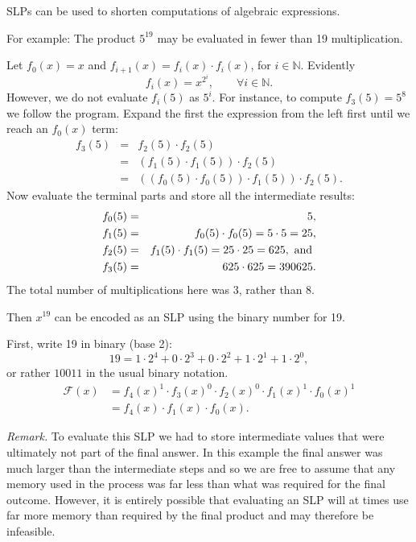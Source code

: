 \documentclass[12pt]{article}
\begin{document}
SLPs can be used to shorten computations of algebraic expressions.

For example: The product $5^{19}$ may be evaluated in fewer than 19 multiplication.

Let $f_0(x)=x$ and $f_{i+1}(x)=f_{i}(x)\cdot f_{i}(x)$, for $i\in \mathbb{N}$.
Evidently
\[f_i(x) =x^{2^i},\qquad \forall i\in\mathbb{N}.\]
However, we do not evaluate $f_i(5)$ as $5^i$.  For instance, to compute $f_3(5)=5^8$ we 
follow the program.  Expand the first the expression from the left first until we
reach an $f_0(x)$ term:
\begin{eqnarray*}
f_3(5) & = & f_2(5)\cdot f_2(5) \\
 & = & ( f_1(5)\cdot f_1(5) )\cdot f_2(5)\\
 & = & ( ( f_0(5)\cdot f_0(5) ) \cdot f_1(5) ) \cdot f_2(5).
\end{eqnarray*}
Now evaluate the terminal parts and store all the intermediate results:
\begin{eqnarray*}
 f_0(5) & = & 5,\\
 f_1(5) & = & f_0(5)\cdot f_0(5)=5\cdot 5=25,\\
 f_2(5) & = & f_1(5)\cdot f_1(5) = 25\cdot 25 = 625,\textnormal{ and }\\
 f_3(5) & = & 625\cdot 625=390625.
\end{eqnarray*}
The total number of multiplications here was 3, rather than 8.  



Then $x^{19}$ can be encoded as an SLP using the binary number for 19.

First, write 19 in binary (base 2): 
\[ 19=1\cdot 2^4+0\cdot 2^3+0\cdot 2^2+1\cdot 2^1+1\cdot 2^0,\]
or rather $10011$ in the usual binary notation.
\begin{equation*}
\begin{split}
  \mathcal{F}(x) & = f_4(x)^1 \cdot f_3(x)^0 \cdot f_2(x)^0\cdot f_1(x)^1\cdot f_0(x)^1\\
     & = f_4(x)\cdot f_1(x)\cdot f_0(x).
\end{split}
\end{equation*}




\emph{Remark.} To evaluate this SLP we had to store intermediate values that
were ultimately not part of the final answer.  In this example the final answer
was much larger than the intermediate steps and so we are free to assume that
any memory used in the process was far less than what was required for the final
outcome.  However, it is entirely possible that evaluating an SLP will at times
use far more memory than required by the final product and may therefore be 
infeasible.
\end{document}
